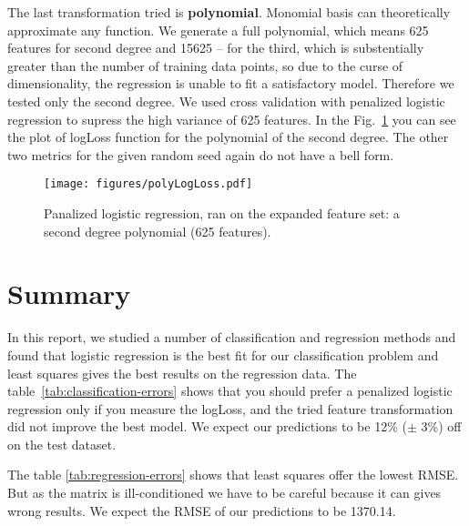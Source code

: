 \documentclass{article} %
\begin{document}
The last transformation tried is {\bf polynomial}. Monomial basis can theoretically approximate any function. We generate a full polynomial, which means 625 features for second degree and 15625 -- for the third, which is substentially greater than the number of training data points, so due to the curse of dimensionality, the regression is unable to fit a satisfactory model. Therefore we tested only the second degree. We used cross validation with penalized logistic regression to supress the high variance of 625 features. In the Fig.~\ref{fig:polyErrors} you can see the plot of logLoss function for the polynomial of the second degree. The other two metrics for the given random seed again do not have a bell form.

\begin{figure}[h]
\center
\texttt{[image: figures/polyLogLoss.pdf]}
\caption{Panalized logistic regression, ran on the expanded feature set: a second degree polynomial (625 features).}
\label{fig:polyErrors}
\end{figure}

\section{Summary}

In this report, we studied a number of classification and regression methods and found that logistic regression is the best fit for our classification problem and least squares gives the best results on the regression data. The table~\ref{tab:classification-errors} shows that you should prefer a penalized logistic regression only if you measure the logLoss, and the tried feature transformation did not improve the best model. We expect our predictions to be 12\% ($\pm$ 3\%) off on the test dataset.

The table \ref{tab:regression-errors} shows that least squares offer the lowest RMSE. But as the matrix is ill-conditioned we have to be careful because it can gives wrong results. 
We expect the RMSE of our predictions to be 1370.14.
\end{document}
